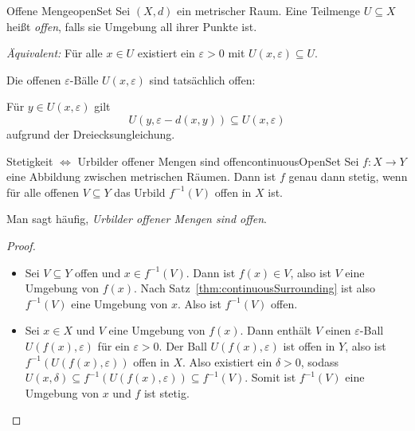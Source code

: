 \documentclass[language=ngerman]{TemplateLecture} %
\begin{document}
\begin{defi}{Offene Menge}{openSet}
    Sei $(X,d)$ ein metrischer Raum. Eine Teilmenge $U \subseteq X$ heißt \emph{offen}, falls sie Umgebung all ihrer Punkte ist.

    \emph{Äquivalent:} Für alle $x \in U$ existiert ein $\varepsilon > 0$ mit $U(x, \varepsilon) \subseteq U$.
\end{defi}

\begin{remark}
    Die offenen $\varepsilon$-Bälle $U(x, \varepsilon)$ sind tatsächlich offen:

    Für $y \in U(x, \varepsilon)$ gilt 
    \begin{equation*}
        U(y, \varepsilon - d(x,y)) \subseteq U(x, \varepsilon)
    \end{equation*}
    aufgrund der Dreiecksungleichung.
\end{remark}

\begin{thm}{Stetigkeit $\Leftrightarrow$ Urbilder offener Mengen sind offen}{continuousOpenSet}
    Sei $f: X \to Y$ eine Abbildung zwischen metrischen Räumen. Dann ist $f$ genau dann stetig, wenn für alle offenen $V \subseteq Y$ das Urbild $f^{-1}(V)$ offen in $X$ ist.
\end{thm}
Man sagt häufig, \emph{Urbilder offener Mengen sind offen}.

\begin{proof}
    \begin{itemize}
        \item[\enquote{$\Rightarrow$}] Sei $V \subseteq Y$ offen und $x \in f^{-1}(V)$. Dann ist $f(x) \in V$, also ist $V$ eine Umgebung von $f(x)$. Nach Satz~\ref{thm:continuousSurrounding} ist also $f^{-1}(V)$ eine Umgebung von $x$. Also ist $f^{-1}(V)$ offen.
        \item[\enquote{$\Leftarrow$}] Sei $x \in X$ und $V$ eine Umgebung von $f(x)$. Dann enthält $V$ einen $\varepsilon$-Ball $U(f(x),\varepsilon)$ für ein $\varepsilon > 0$. Der Ball $U(f(x), \varepsilon)$ ist offen in $Y$, also ist $f^{-1}(U(f(x),\varepsilon))$ offen in $X$. Also existiert ein $\delta > 0$, sodass $U(x, \delta) \subseteq f^{-1}(U(f(x),\varepsilon)) \subseteq f^{-1}(V)$. Somit ist $f^{-1}(V)$ eine Umgebung von $x$ und $f$ ist stetig.
    \end{itemize}
\end{proof}


\end{document}
